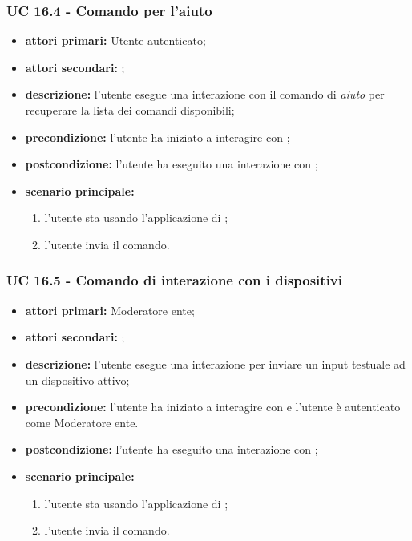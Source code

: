 	\subsubsection{UC 16.4 - Comando per l'aiuto}


	\begin{itemize}
		\item \textbf{attori primari:} Utente autenticato;
		\item \textbf{attori secondari:} ;
		\item \textbf{descrizione:} l'utente esegue una interazione con il comando di \textit{aiuto} per recuperare la lista dei comandi disponibili;
		\item \textbf{precondizione:} l'utente ha iniziato a interagire con ;
		\item \textbf{postcondizione:} l'utente ha eseguito una interazione con ;
		\item \textbf{scenario principale:}
		\begin{enumerate}
			\item l'utente sta usando l'applicazione di ; 
			\item l'utente invia il comando.
		\end{enumerate}
	\end{itemize}


	\subsubsection{UC 16.5 - Comando di interazione con i dispositivi}

	\begin{itemize}
		\item \textbf{attori primari:} Moderatore ente;
		\item \textbf{attori secondari:} ;
		\item \textbf{descrizione:} l'utente esegue una interazione per inviare un input testuale ad un dispositivo attivo; 
		\item \textbf{precondizione:} l'utente ha iniziato a interagire con  e l'utente è autenticato come Moderatore ente.
		\item \textbf{postcondizione:} l'utente ha eseguito una interazione con ;
		\item \textbf{scenario principale:}
		\begin{enumerate}
			\item l'utente sta usando l'applicazione di ;
			\item l'utente invia il comando.
		\end{enumerate}
	\end{itemize}


